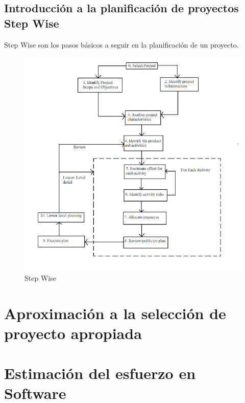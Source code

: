 \documentclass[12pt]{article}
\begin{document}
\subsection{Introducción a la planificación de proyectos Step Wise}

{Step Wise son los pasos básicos a seguir en la planificación de un proyecto.}

\begin{figure} [ht]
    \centering
    \includegraphics[width=\textwidth]{step_wise.png}
    \caption{Step Wise}
    \label{fig:3.1}
\end{figure}


\newpage
\section[Aproximación a la selección de proyecto apropiada]{Aproximación a la selección de\\proyecto apropiada}
\label{4.0.0}


\newpage
\section{Estimación del esfuerzo en Software}
\label{5.0.0}
\end{document}
